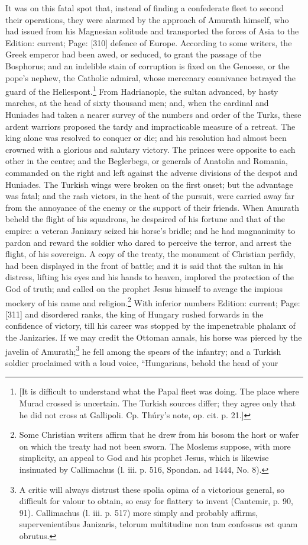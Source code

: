 It was on this fatal spot that, instead of finding a confederate fleet to second their operations, they were alarmed by the approach of Amurath himself, who had issued from his Magnesian solitude and transported the forces of Asia to the Edition: current; Page: [310] defence of Europe. According to some writers, the Greek emperor had been awed, or seduced, to grant the passage of the Bosphorus; and an indelible stain of corruption is fixed on the Genoese, or the pope\texthebrew{}’s nephew, the Catholic admiral, whose mercenary connivance betrayed the guard of the Hellespont.\footnote{[It is difficult to understand what the Papal fleet was doing. The place where Murad crossed is uncertain. The Turkish sources differ; they agree only that he did not cross at Gallipoli. Cp. Thúry\texthebrew{}’s note, op. cit. p. 21.]} From Hadrianople, the sultan advanced, by hasty marches, at the head of sixty thousand men; and, when the cardinal and Huniades had taken a nearer survey of the numbers and order of the Turks, these ardent warriors proposed the tardy and impracticable measure of a retreat. The king alone was resolved to conquer or die; and his resolution had almost been crowned with a glorious and salutary victory. The princes were opposite to each other in the centre; and the Beglerbegs, or generals of Anatolia and Romania, commanded on the right and left against the adverse divisions of the despot and Huniades. The Turkish wings were broken on the first onset; but the advantage was fatal; and the rash victors, in the heat of the pursuit, were carried away far from the annoyance of the enemy or the support of their friends. When Amurath beheld the flight of his squadrons, he despaired of his fortune and that of the empire: a veteran Janizary seized his horse\texthebrew{}’s bridle; and he had magnanimity to pardon and reward the soldier who dared to perceive the terror, and arrest the flight, of his sovereign. A copy of the treaty, the monument of Christian perfidy, had been displayed in the front of battle; and it is said that the sultan in his distress, lifting his eyes and his hands to heaven, implored the protection of the God of truth; and called on the prophet Jesus himself to avenge the impious mockery of his name and religion.\footnote{Some Christian writers affirm that he drew from his bosom the host or wafer on which the treaty had not been sworn. The Moslems suppose, with more simplicity, an appeal to God and his prophet Jesus, which is likewise insinuated by Callimachus (l. iii. p. 516, Spondan. ad 1444, No. 8).} With inferior numbers Edition: current; Page: [311] and disordered ranks, the king of Hungary rushed forwards in the confidence of victory, till his career was stopped by the impenetrable phalanx of the Janizaries. If we may credit the Ottoman annals, his horse was pierced by the javelin of Amurath;\footnote{A critic will always distrust these spolia opima of a victorious general, so difficult for valour to obtain, so easy for flattery to invent (Cantemir, p. 90, 91). Callimachus (l. iii. p. 517) more simply and probably affirms, supervenientibus Janizaris, telorum multitudine non tam confossus est quam obrutus.} he fell among the spears of the infantry; and a Turkish soldier proclaimed with a loud voice, \texthebrew{“}Hungarians, behold the head of your 